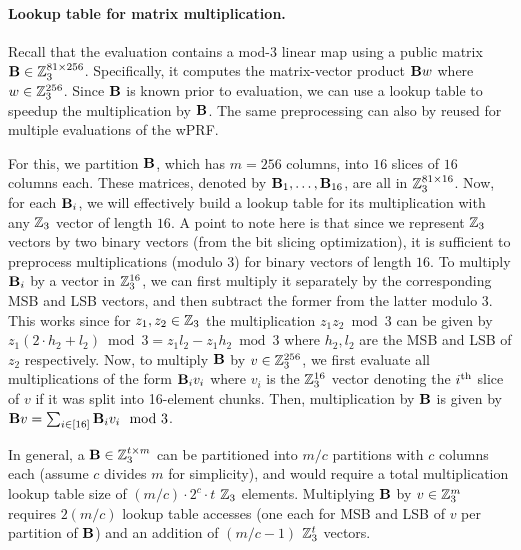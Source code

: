 \paragraph{Lookup table for matrix multiplication.} Recall that the \ttwPRF evaluation contains a mod-3 linear map using a public matrix $\mat{B} \in \Z_3^{81\times256}$. Specifically, it computes the matrix-vector product $\mat{B}w$ where $w \in \mathbb{Z}_3^{256}$. Since $\mat{B}$ is known prior to evaluation, we can use a lookup table to speedup the multiplication by $\mat{B}$\cite{arlazarov1970economical}. The same preprocessing can also by reused for multiple evaluations of the wPRF.

For this, we partition $\mat{B}$, which has $m=256$ columns, into $16$ slices of $16$ columns each. These matrices, denoted by $\mat{B}_1,\dots, \mat{B}_{16}$, are all in $\mathbb{Z}_3^{81 \times 16}$. Now, for each $\mat{B}_i$, we will effectively build a lookup table for its multiplication with any $\mathbb{Z}_3$ vector of length $16$. A point to note here is that since we  represent $\mathbb{Z}_3$ vectors by two binary vectors (from the bit slicing optimization), it is sufficient to preprocess multiplications (modulo 3) for binary vectors of length $16$. To multiply $\mat{B}_{i}$ by a vector in $\mathbb{Z}_3^{16}$, we can first multiply it separately by the corresponding MSB and LSB vectors, and then subtract the former from the latter modulo 3. This works since for $z_1, z_2 \in \mathbb{Z}_3$ the multiplication $z_1z_2 \bmod 3$ can be given by $z_1(2\cdot h_2 + l_2) \bmod 3 = z_1l_2 - z_1h_2 \bmod 3$ where $h_2, l_2$ are the MSB and LSB of $z_2$ respectively. Now, to multiply $\mat{B}$ by $v \in \mathbb{Z}_3^{256}$, we first evaluate all multiplications of the form $\mat{B}_iv_i$ where $v_i$ is the $\mathbb{Z}_3^{16}$ vector denoting the $i^{\textnormal{th}}$ slice of $v$ if it was split into 16-element chunks. Then, multiplication by $\mat{B}$ is given by $\mat{B}v = \sum_{i \in [16]} \mat{B}_i v_i \mod 3$.

In general, a $\mat{B} \in \Z_3^{t \times m}$ can be partitioned into $m/c$ partitions with $c$ columns each (assume $c$ divides $m$ for simplicity), and would require a total multiplication lookup table size of $(m/c) \cdot 2^c \cdot t$ $\mathbb{Z}_3$ elements. Multiplying $\mat{B}$ by $v \in \mathbb{Z}_3^{m}$ requires $2(m/c)$ lookup table accesses (one each for MSB and LSB of $v$ per partition of $\mat{B}$) and an addition of $(m/c - 1)$ $\mathbb{Z}_3^{t}$ vectors.


